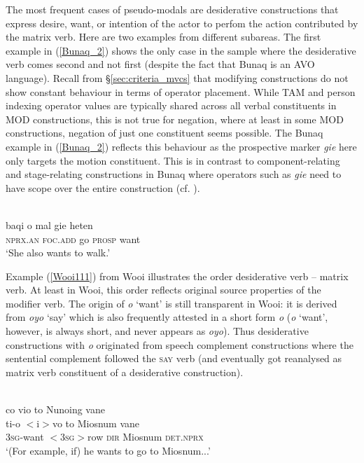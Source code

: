 The most frequent cases of pseudo-modals are desiderative constructions that express desire, want, or intention of the actor to perfom the action contributed by the matrix verb. Here are two examples from different subareas. The first example in (\ref{Bunaq_2}) shows the only case in the sample where the desiderative verb comes second and not first (despite the fact that Bunaq is an AVO language). Recall from §\ref{sec:criteria_mvcs} that modifying constructions do not show constant behaviour in terms of operator placement. While TAM and person indexing operator values are typically shared across all verbal constituents in MOD constructions, this is not true for negation, where at least in some MOD constructions, negation of just one constituent seems possible. The Bunaq example in (\ref{Bunaq_2}) reflects this behaviour as the prospective marker \textit{gie} here only targets the motion constituent. This is in contrast to component-relating and stage-relating constructions in Bunaq where operators such as \textit{gie} need to have scope over the entire construction (cf. \citealt[443f.]{schapper2009bunaq}).

\ea \label{Bunaq_2}
\\
\gll baqi o mal gie heten \\
\textsc{nprx}.\textsc{an} \textsc{foc}.\textsc{add} go \textsc{prosp} want \\
\glft `She also wants to walk.’\\ 
\z

Example (\ref{Wooi111}) from Wooi illustrates the order desiderative verb -- matrix verb. At least in Wooi, this order reflects  original source properties of the modifier verb. The origin of \textit{o} `want' is still transparent in Wooi: it is derived from \textit{oyo} `say' which is also frequently attested in a short form \textit{o} (\textit{o} `want', however, is always short, and never appears as \textit{oyo}). Thus desiderative constructions with \textit{o} originated from speech complement constructions where the sentential complement followed the \textsc{say} verb (and eventually got reanalysed as matrix verb constituent of a desiderative construction).

\ea \label{Wooi111}
\\
\glll co vio to Nunoing vane \\
ti-o $<$i$>$vo to Miosnum vane \\
3\textsc{sg}-want $<$3\textsc{sg}$>$row \textsc{dir} Miosnum \textsc{det}.\textsc{nprx} \\
\glft `(For example, if) he wants to go to Miosnum...'\\ 
\z

